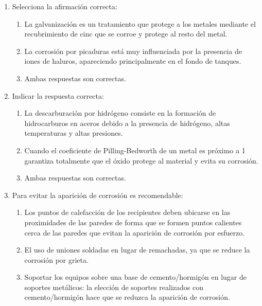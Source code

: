 \begin{enumerate}
    \item Selecciona la afirmación correcta:
          \begin{enumerate}[label=\alph*.]
              \item La galvanización es un tratamiento que protege a los metales mediante el recubrimiento de cinc que se corroe y protege al resto del metal.
              \item La corrosión por picaduras está muy influenciada por la presencia de iones de haluros, apareciendo principalmente en el fondo de tanques.
              \item \textcolor{red!85!black}{Ambas respuestas son correctas.}
          \end{enumerate}

    \item Indicar la respuesta correcta:
          \begin{enumerate}[label=\alph*.]
              \item \textcolor{red!85!black}{La descarburación por hidrógeno consiste en la formación de hidrocarburos en aceros debido a la presencia de hidrógeno, altas temperaturas y altas presiones.}
              \item Cuando el coeficiente de Pilling-Bedworth de un metal es próximo a 1 garantiza totalmente que el óxido protege al material y evita su corrosión.
              \item Ambas respuestas son correctas.
          \end{enumerate}

    \item Para evitar la aparición de corrosión es recomendable:
          \begin{enumerate}[label=\alph*.]
              \item Los puntos de calefacción de los recipientes deben ubicarse en las proximidades de las paredes de forma que se formen puntos calientes cerca de las paredes que evitan la aparición de corrosión por esfuerzo.
              \item \textcolor{red!85!black}{El uso de uniones soldadas en lugar de remachadas, ya que se reduce la corrosión por grieta.}
              \item Soportar los equipos sobre una base de cemento/hormigón en lugar de soportes metálicos: la elección de soportes realizados con cemento/hormigón hace que se reduzca la aparición de corrosión.
          \end{enumerate}


\end{enumerate}
